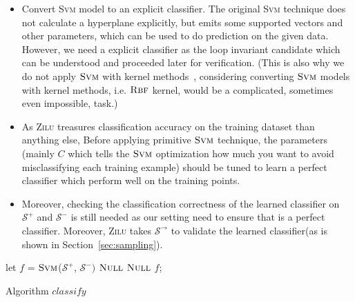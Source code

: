 \begin{itemize}
\item Convert \textsc{Svm} model to an explicit classifier.
The original \textsc{Svm} technique does not calculate a hyperplane explicitly, but emits some supported vectors and other parameters,
which can be used to do prediction on the given data.
However, we need a explicit classifier as the loop invariant candidate which can be understood and proceeded later for verification.
(This is also why we do not apply $\textsc{Svm}$ with kernel methods~\cite{yu2009evolving},
considering converting $\textsc{Svm}$ models with kernel methods, i.e. $\textsc{Rbf}$ kernel, would be a complicated, sometimes even impossible, task.)

\item As \textsc{Zilu} treasures classification accuracy on the training dataset than anything else,
Before applying primitive $\textsc{Svm}$ technique, the parameters 
(mainly $C$ which tells the $\textsc{Svm}$ optimization how much you want to avoid misclassifying each training example)
should be tuned to learn a perfect classifier which perform well on the training points.

\item Moreover, checking the classification correctness of the learned classifier 
on $\mathcal{S}^+$ and $\mathcal{S}^-$ is still needed as our setting need to ensure that is a perfect classifier.
Moreover, \textsc{Zilu} takes $\mathcal{S}^\rightarrow$ to validate the learned classifier(as is shown in Section~\ref{sec:sampling}).
\end{itemize} 


\begin{algorithm}[!h]
\SetAlgoVlined
\Indm
{}
\Indp
    let $f$ = $\textsc{Svm}$($\mathcal{S}^+$, $\mathcal{S}^-)$\;
     {
        \Return $\textsc{Null}$\;
    }
     {
        \Return $\textsc{Null}$\;
    }
    \Return $f$;
\caption{Algorithm $classify$}
\label{alg:classify}
\end{algorithm}


